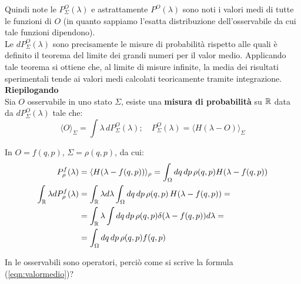 \documentclass[FisicaTeorica.tex]{subfiles}
\begin{document}
Quindi note le $P_\Sigma^O\left(\lambda\right)$ e astrattamente $P^O\left(\lambda\right)$ sono noti i valori medi di tutte le funzioni di $O$ (in quanto sappiamo l'esatta distribuzione dell'osservabile da cui tale funzioni dipendono).\\
Le $dP_\Sigma^O\left(\lambda\right)$ sono precisamente le misure di probabilità rispetto alle quali è definito il teorema del limite dei grandi numeri per il valor medio. Applicando tale teorema si ottiene che, al limite di misure infinite, la media dei risultati sperimentali tende ai valori medi calcolati teoricamente tramite integrazione.\\

\textbf{Riepilogando}\\
Sia $O$ osservabile in uno stato $\Sigma$, esiste una \textbf{misura di probabilità} su $\mathbb{R}$ data da $dP_\Sigma^O\left(\lambda\right)$ tale che:
\begin{equation}
\langle O \rangle_\Sigma = \int \lambda\,dP_\Sigma^O(\lambda); \quad P_\Sigma^O(\lambda) = \langle H(\lambda-O)\rangle_\Sigma
\label{eqn:valormedio}
\end{equation}

In \textbf{\MC} $O=f(q,p)$, $\Sigma=\rho(q,p)$, da cui:
\begin{align*}
    P_\rho^f(\lambda)&=\langle H( \lambda-f(q,p)) \rangle_\rho= \int_{\Omega}{dq\, dp\,\rho(q,p)H(\lambda-f(q,p))}\\
    \int_{\mathbb{R}} \lambda dP_\rho^f (\lambda) &= \int_{\mathbb{R}} \lambda d\lambda \int_\Omega dq\,dp\,\rho(q,p)\, H(\lambda-f(q,p)) = \\
    &= \int_{\mathbb{R}} \lambda \int dq\,dp\,\rho(q,p) \delta(\lambda-f(q,p))d\lambda = \\
    &= \int_\Omega dq\, dp\, \rho(q,p) f(q,p)
\end{align*}

\begin{question}
In \textbf{\MQ} le osservabili sono operatori, perciò come si scrive la formula (\ref{eqn:valormedio})?
\label{q:prob-mq}
\end{question}
\end{document}
